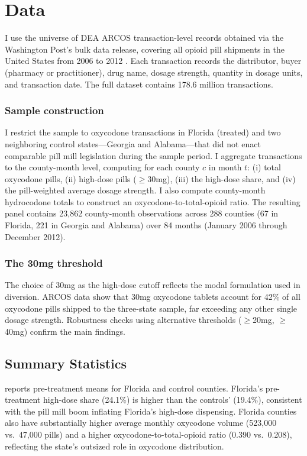 \documentclass[12pt]{article}
\begin{document}
\section{Data}

I use the universe of DEA ARCOS transaction-level records obtained via the Washington Post's bulk data release, covering all opioid pill shipments in the United States from 2006 to 2012 \citep{okaneku2024tracing}. Each transaction records the distributor, buyer (pharmacy or practitioner), drug name, dosage strength, quantity in dosage units, and transaction date. The full dataset contains 178.6 million transactions.

\subsubsection*{Sample construction} I restrict the sample to oxycodone transactions in Florida (treated) and two neighboring control states---Georgia and Alabama---that did not enact comparable pill mill legislation during the sample period. I aggregate transactions to the county-month level, computing for each county $c$ in month $t$: (i) total oxycodone pills, (ii) high-dose pills ($\geq$30mg), (iii) the high-dose share, and (iv) the pill-weighted average dosage strength. I also compute county-month hydrocodone totals to construct an oxycodone-to-total-opioid ratio. The resulting panel contains 23,862 county-month observations across 288 counties (67 in Florida, 221 in Georgia and Alabama) over 84 months (January 2006 through December 2012).

\subsubsection*{The 30mg threshold} The choice of 30mg as the high-dose cutoff reflects the modal formulation used in diversion. ARCOS data show that 30mg oxycodone tablets account for 42\% of all oxycodone pills shipped to the three-state sample, far exceeding any other single dosage strength. Robustness checks using alternative thresholds ($\geq$20mg, $\geq$40mg) confirm the main findings.

\subsection{Summary Statistics}



 reports pre-treatment means for Florida and control counties. Florida's pre-treatment high-dose share (24.1\%) is higher than the controls' (19.4\%), consistent with the pill mill boom inflating Florida's high-dose dispensing. Florida counties also have substantially higher average monthly oxycodone volume (523,000 vs.\ 47,000 pills) and a higher oxycodone-to-total-opioid ratio (0.390 vs.\ 0.208), reflecting the state's outsized role in oxycodone distribution.
\end{document}
